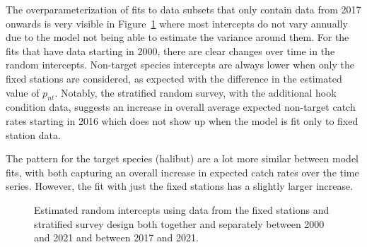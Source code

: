 \documentclass[12pt]{article}\usepackage[]{graphicx}\usepackage[]{color}
\begin{document}
The overparameterization of fits to data subsets that only contain data from 2017 onwards is very visible in Figure~\ref{fig:rand-int} where most intercepts do not vary annually due to the model not being able to estimate the variance around them. For the fits that have data starting in 2000, there are clear changes over time in the random intercepts. Non-target species intercepts are always lower when only the fixed stations are considered, as expected with the difference in the estimated value of \(p_{nt}\). Notably, the stratified random survey, with the additional hook condition data, suggests an increase in overall average expected non-target catch rates starting in 2016 which does not show up when the model is fit only to fixed station data.

The pattern for the target species (halibut) are a lot more similar between model fits, with both capturing an overall increase in expected catch rates over the time series. However, the fit with just the fixed stations has a slightly larger increase.
\begin{figure}[htb]

{\centering {}  

}

\caption{Estimated random intercepts using data from the fixed stations and stratified survey design both together and separately between 2000 and 2021 and between 2017 and 2021.}\label{fig:rand-int}
\end{figure}
\end{document}
